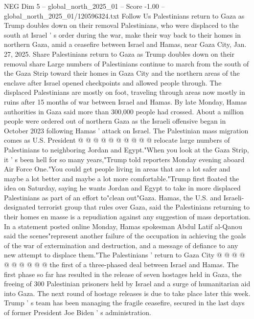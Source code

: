 \begin{textsample}{NEG Dim 5 – global\_north\_2025\_01 – Score -1.00 – global\_north\_2025\_01/120596324.txt}  \label{ex:f5_neg_073}
Follow Us Palestinians return to Gaza as Trump doubles down on their removal Palestinians, who were displaced to the south at Israel ' s order during the war, make their way back to their homes in northern Gaza, amid a ceasefire between Israel and Hamas, near Gaza City, Jan. 27, 2025.
Share Palestinians return to Gaza as Trump doubles down on their removal share Large numbers of Palestinians continue to march from the south of the Gaza Strip toward their homes in Gaza City and the northern areas of the enclave after Israel opened checkpoints and allowed people through.
The displaced Palestinians are mostly on foot, traveling through areas now mostly in ruins after 15 months of war between Israel and Hamas.
By late Monday, Hamas authorities in Gaza said more than 300,000 people had crossed.
About a million people were ordered out of northern Gaza as the Israeli offensive began in October 2023 following Hamas ' attack on Israel.
The Palestinian mass migration comes as U.S.
President @ @ @ @ @ @ @ @ @ @ relocate large numbers of Palestinians to neighboring Jordan and Egypt."When you look at the Gaza Strip, it ' s been hell for so many years,"Trump told reporters Monday evening aboard Air Force One."You could get people living in areas that are a lot safer and maybe a lot better and maybe a lot more comfortable."Trump first floated the idea on Saturday, saying he wants Jordan and Egypt to take in more displaced Palestinians as part of an effort to"clean out"Gaza.
Hamas, the U.S. and Israeli-designated terrorist group that rules over Gaza, said the Palestinians returning to their homes en masse is a repudiation against any suggestion of mass deportation.
In a statement posted online Monday, Hamas spokesman Abdul Latif al-Qanou said the scenes"represent another failure of the occupation in achieving the goals of the war of extermination and destruction, and a message of defiance to any new attempt to displace them."The Palestinians ' return to Gaza City @ @ @ @ @ @ @ @ @ @ the first of a three-phased deal between Israel and Hamas.
The first phase so far has resulted in the release of seven hostages held in Gaza, the freeing of 300 Palestinian prisoners held by Israel and a surge of humanitarian aid into Gaza.
The next round of hostage releases is due to take place later this week.
Trump ' s team has been managing the fragile ceasefire, secured in the last days of former President Joe Biden ' s administration.

\end{textsample}
